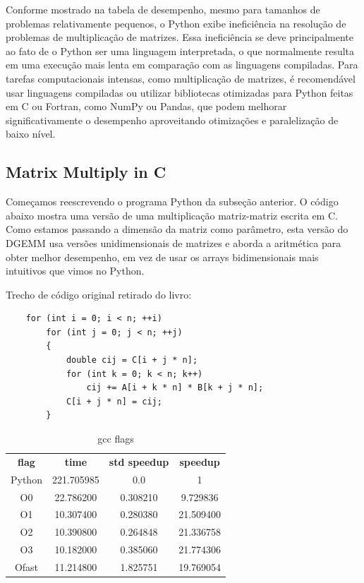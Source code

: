 \documentclass[12pt]{article}
\begin{document}
Conforme mostrado na tabela de desempenho, mesmo para tamanhos de problemas relativamente pequenos, o Python exibe ineficiência na resolução de problemas de multiplicação de matrizes. Essa ineficiência se deve principalmente ao fato de o Python ser uma linguagem interpretada, o que normalmente resulta em uma execução mais lenta em comparação com as linguagens compiladas. Para tarefas computacionais intensas, como multiplicação de matrizes, é recomendável usar linguagens compiladas ou utilizar bibliotecas otimizadas para Python feitas em C ou Fortran, como NumPy ou Pandas, que podem melhorar significativamente o desempenho aproveitando otimizações e paralelização de baixo nível.

\newpage
\newpage

\subsection{Matrix Multiply in C}

Começamos reescrevendo o programa Python da subseção anterior. O código abaixo mostra uma versão de uma multiplicação matriz-matriz escrita em C. Como estamos passando a dimensão da matriz como parâmetro, esta versão do DGEMM usa versões unidimensionais de matrizes e aborda a aritmética para obter melhor desempenho, em vez de usar os arrays bidimensionais mais intuitivos que vimos no Python.

Trecho de código original retirado do livro:

\begin{lstlisting}
    for (int i = 0; i < n; ++i)
        for (int j = 0; j < n; ++j)
        {
            double cij = C[i + j * n];
            for (int k = 0; k < n; k++)
                cij += A[i + k * n] * B[k + j * n];
            C[i + j * n] = cij;
        }
\end{lstlisting}

\begin{table}[h]
    \centering
    \label{tab:gcc-flags}
    \begin{tabular}{cccc}
        \textbf{flag} & \textbf{time} & \textbf{std speedup} & \textbf{speedup} \\
        Python & 221.705985 & 0.0 & 1\\
        O0 &	 22.786200   &	0.308210  &	9.729836 \\
        O1 & 10.307400 & 0.280380 & 21.509400 \\
        O2 & 10.390800 & 0.264848 & 21.336758 \\
        O3 & 10.182000 & 0.385060 & 21.774306 \\
        Ofast & 11.214800 & 1.825751 & 19.769054 \\
    \end{tabular}
    \caption{gcc flags}
\end{table}
\end{document}
